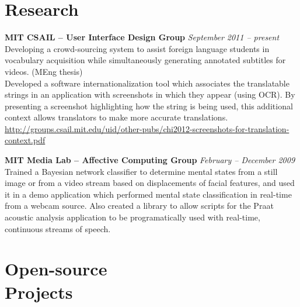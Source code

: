 \documentclass[margin,line]{resume}
\begin{document}
\begin{resume}
\section{\mysidestyle Research}

\textbf{MIT CSAIL -- User Interface Design Group} \hfill \textsl{September 2011 -- present}\\
Developing a crowd-sourcing system to assist foreign language students in vocabulary acquisition while simultaneously generating annotated subtitles for videos. (MEng thesis)\\ %
Developed a software internationalization tool which associates the translatable strings in an application with screenshots in which they appear (using OCR). By presenting a screenshot highlighting how the string is being used, this additional context allows translators to make more accurate translations.\\
\url{http://groups.csail.mit.edu/uid/other-pubs/chi2012-screenshots-for-translation-context.pdf}

\textbf{MIT Media Lab -- Affective Computing Group} \hfill \textsl{February -- December 2009}\\
Trained a Bayesian network classifier to determine mental states from a still image or from a video stream based on displacements of facial features, and used it in a demo application which performed mental state classification in real-time from a webcam source.
Also created a library to allow scripts for the Praat acoustic analysis application to be programatically used with real-time, continuous streams of speech.


\section{\mysidestyle Open-source\\Projects}


\end{resume}
\end{document}
